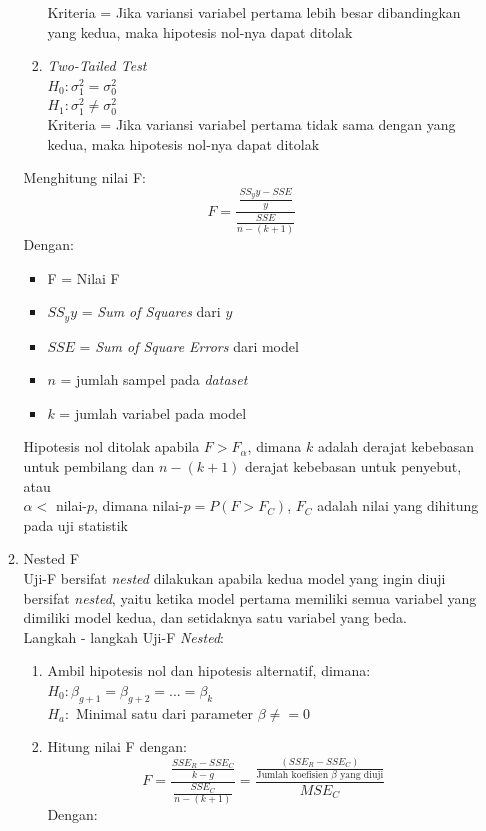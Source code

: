 \begin{enumerate}
\begin{enumerate}
\begin{enumerate}
        Kriteria = Jika variansi variabel pertama lebih besar dibandingkan yang kedua, maka hipotesis nol-nya dapat ditolak
        \item \textit{Two-Tailed Test} \\
        $H_0:\sigma_1^2 = \sigma_0^2$ \\  
        $H_1:\sigma_1^2 \neq \sigma_0^2$ \\
        Kriteria = Jika variansi variabel pertama tidak sama dengan yang kedua, maka hipotesis nol-nya dapat ditolak
    \end{enumerate}
    Menghitung nilai F:
    \begin{equation*}
        F = \frac{\frac{SS_yy - SSE}{y}}{\frac{SSE}{n - (k + 1)}}
    \end{equation*}
    Dengan:
    \begin{itemize}
        \item F = Nilai F
        \item $SS_yy$ = \textit{Sum of Squares} dari $y$
        \item $SSE$ = \textit{Sum of Square Errors} dari model
        \item $n$ = jumlah sampel pada \textit{dataset}
        \item $k$ = jumlah variabel pada model
    \end{itemize}
     Hipotesis nol ditolak apabila $F > F_{\alpha}$, dimana $k$ adalah derajat kebebasan untuk pembilang dan $n - (k + 1)$ derajat kebebasan untuk penyebut, atau \\
    $\alpha <$ nilai-$p$, dimana nilai-$p = P(F > F_C)$, $F_C$ adalah nilai yang dihitung pada uji statistik
    \item Nested F \\
    Uji-F bersifat \textit{nested} dilakukan apabila kedua model yang ingin diuji bersifat \textit{nested}, yaitu ketika model pertama memiliki semua variabel yang dimiliki model kedua, dan setidaknya satu variabel yang beda. \\
    Langkah - langkah Uji-F \textit{Nested}:
    
    \begin{enumerate}
        \item Ambil hipotesis nol dan hipotesis alternatif, dimana: \\
            $H_0: \beta_{g + 1} = \beta_{g + 2} = ... = \beta_k $ \\
            $H_a:$ Minimal satu dari parameter $\beta \neq = 0$ \\
        \item Hitung nilai F dengan:
        \begin{equation*}
            F = \frac{\frac{SSE_R - SSE_C}{k - g}}{\frac{SSE_C}{n - (k + 1)}} = \frac{\frac{(SSE_R - SSE_C)}{\text{Jumlah koefisien } \beta \text{ yang diuji}}}{MSE_C}
        \end{equation*}
        Dengan: \\


\end{enumerate}
\end{enumerate}
\end{enumerate}
